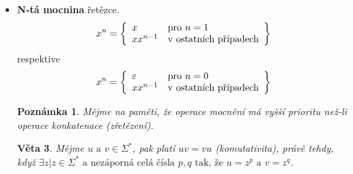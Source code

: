 \documentclass[10pt, a4paper, titlepage]{article}
\theoremstyle{note}
\newtheorem{veta}{Věta}
\newtheorem{poznamka}{Poznámka}
\begin{document}
\begin{itemize}
\begin{itemize}
\item
\textbf{Infix} řetězce. Označme jej $Ifx(x) = \lbrace y | \exists z_{1}, z_{2} \text{ tak, že } z_{1}yz_{2} = x \rbrace$.

\item
\textbf{Sufix} řetězce. Označme jej $Sfx(x) = \lbrace y | \exists z \text{ tak, že } zy = x \rbrace$.
\end{itemize}

\begin{veta}
\begin{gather*}
xy = xz \: \Longrightarrow \: y = z \\
yx = zx \: \Longrightarrow \: y = z
\end{gather*}
Algebraicky je operace zapsána jako $\langle \Sigma^{*}, \cdot, \varepsilon \rangle$.
\end{veta}

\begin{veta}
Vyslovme předpoklad, že platí $xy = uv$. Pak platí právě jedno z těchto tvrzení:
\begin{gather*}
x = u, y = v \\
|x| > |u| \text{ a } \exists w| w \neq \varepsilon, \text{ tak že } x = uw \text{ a } v = wy \\
|x| < |u| \text{ a } \exists w| w \neq \varepsilon, \text{ tak že } u = xw \text{ a } y = wv
\end{gather*}
\end{veta}

\item
\textbf{N-tá mocnina} řetězce.
$$
x^{n} = \left\lbrace
\begin{array}{l l}
x & \text{pro } n=1 \\
xx^{n-1} & \text{v ostatních případech} \\
\end{array}
\right\rbrace
$$
respektive
$$ x^{n} = \left\lbrace
\begin{array}{l l}
\varepsilon & \text{pro } n=0 \\
xx^{n-1} & \text{v ostatních případech} \\
\end{array}
\right\rbrace
$$
\begin{poznamka}
Mějme na paměti, že operace mocnění má vyšší prioritu než-li operace konkatenace (zřetězení).
\end{poznamka}

\begin{veta}
Mějme $u \text{ a } v \in \Sigma^{*}$, pak platí $uv = vu$ (komutativita), právě
tehdy, když $\exists z| z \in \Sigma^{*} \text{ a nezáporná celá čísla } p, q \text{ tak, že } u = z^{p} \text{ a } v=z^{q}$.
\end{veta}


\end{itemize}
\end{document}
